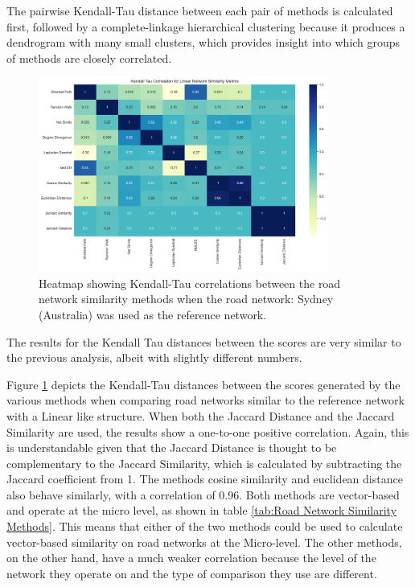 The pairwise Kendall-Tau distance between each pair of methods is calculated first, followed by a complete-linkage hierarchical clustering because it produces a dendrogram with many small clusters, which provides insight into which groups of methods are closely correlated.

\begin{figure}[!ht]
\centering
\includegraphics[width=0.85\textwidth,center]{picture/Linear/linear2.png}
\caption[Heatmap showing Kendall-Tau correlations between the road network similarity methods for Linear Road Networks]{Heatmap showing Kendall-Tau correlations between the road network similarity methods when the road network: Sydney (Australia) was used as the reference network.}
\label{fig:network ranking linear}
\end{figure}

The results for the Kendall Tau distances between the scores are very similar to the previous analysis, albeit with slightly different numbers.

Figure \ref{fig:network ranking linear} depicts the Kendall-Tau distances between the scores generated by the various methods when comparing road networks similar to the reference network with a Linear like structure. When both the Jaccard Distance and the Jaccard Similarity are used, the results show a one-to-one positive correlation. Again, this is understandable given that the Jaccard Distance is thought to be complementary to the Jaccard Similarity, which is calculated by subtracting the Jaccard coefficient from 1. The methods cosine similarity and euclidean distance also behave similarly, with a correlation of 0.96. Both methods are vector-based and operate at the micro level, as shown in table \ref{tab:Road Network Similarity Methods}. This means that either of the two methods could be used to calculate vector-based similarity on road networks at the Micro-level. The other methods, on the other hand, have a much weaker correlation because the level of the network they operate on and the type of comparison they use are different.


